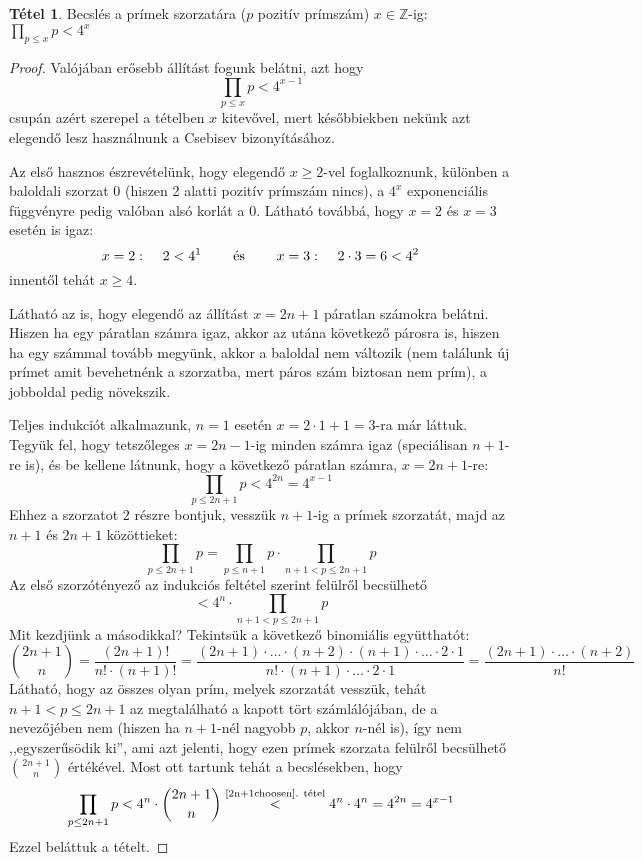 \documentclass[12pt]{book}
\theoremstyle{plain} %
\theoremstyle{definition} %
\newtheorem{theo/}{Tétel}[section]
\newenvironment{theo}
  {\renewcommand{\qedsymbol}{$\clubsuit$}%
   \pushQED{\qed}\begin{theo/}}
  {\popQED\end{theo/}}
\theoremstyle{remark}
\renewcommand\qedsymbol{$\blacksquare$}
\numberwithin{equation}{section}  %
\def\Z{\mathbb{Z}}
\begin{document}
	\begin{theo}\label{primekszorzata}
		Becslés a prímek szorzatára ($p$ pozitív prímszám) $x\in \Z$-ig: $\displaystyle \prod\limits_{p\leq x} p < 4^x$
	\end{theo}

	\begin{proof}
		Valójában erősebb állítást fogunk belátni, azt hogy
		\[ \prod_{p\leq x} p < 4^{x-1}  \]
		csupán azért szerepel a tételben $x$ kitevővel, mert későbbiekben nekünk azt elegendő lesz használnunk a Csebisev bizonyításához.
		
		Az első hasznos észrevételünk, hogy elegendő $x\geq 2$-vel foglalkoznunk, különben a baloldali szorzat $0$ (hiszen 2 alatti pozitív prímszám nincs), a $4^x$ exponenciális függvényre pedig valóban alsó korlát a $0$. Látható továbbá, hogy $x=2$ és $x=3$ esetén is igaz:
		\[ x=2: \hspace{4mm} 2 < 4^1 \hspace{8mm} \text{és} \hspace{8mm} x=3: \hspace{4mm} 2\cdot 3 = 6 < 4^2  \]
		innentől tehát $x\geq 4$.
		
		Látható az is, hogy elegendő az állítást $x=2n+1$ páratlan számokra belátni. Hiszen ha egy páratlan számra igaz, akkor az utána következő párosra is, hiszen ha egy számmal tovább megyünk, akkor a baloldal nem változik (nem találunk új prímet amit bevehetnénk a szorzatba, mert páros szám biztosan nem prím), a jobboldal pedig növekszik.
		
		Teljes indukciót alkalmazunk, $n=1$ esetén $x=2\cdot 1 + 1 = 3$-ra már láttuk. Tegyük fel, hogy tetszőleges $x=2n-1$-ig minden számra igaz (speciálisan $n+1$-re is), és be kellene látnunk, hogy a következő páratlan számra, $x=2n+1$-re:
		\[ \prod_{p\leq 2n+1} p < 4^{2n} = 4^{x-1}  \]
		Ehhez a szorzatot $2$ részre bontjuk, vesszük $n+1$-ig a prímek szorzatát, majd az $n+1$ és $2n+1$ közöttieket:
		\[  \prod_{p\leq 2n+1} p =  \prod_{p\leq n+1} p \cdot  \prod_{n+1 < p\leq 2n+1} p \]
		Az első szorzótényező az indukciós feltétel szerint felülről becsülhető
		\[ < 4^{n} \cdot  \prod_{n+1 < p\leq 2n+1} p  \]
		Mit kezdjünk a másodikkal? Tekintsük a következő binomiális együtthatót:
		\[ {2n+1\choose n} = \dfrac{(2n+1)!}{n!\cdot (n+1)!} = \dfrac{(2n+1)\cdot \ldots \cdot (n+2)\cdot (n+1)\cdot \ldots \cdot 2\cdot 1}{n! \cdot (n+1) \cdot \ldots \cdot 2 \cdot 1} = \dfrac{(2n+1)\cdot \ldots \cdot (n+2)}{n!}  \]
		Látható, hogy az összes olyan prím, melyek szorzatát vesszük, tehát $n+1<p\leq 2n+1$ az megtalálható a kapott tört számlálójában, de a nevezőjében nem (hiszen ha $n+1$-nél nagyobb $p$, akkor $n$-nél is), így nem ,,egyszerűsödik ki'', ami azt jelenti, hogy ezen prímek szorzata felülről becsülhető ${2n+1\choose n}$ értékével. Most ott tartunk tehát a becslésekben, hogy
		\[ \prod_{p\leq 2n+1} p < 4^n \cdot {2n+1\choose n} \stackrel{\text{\ref{2n+1choosen}. tétel}}{<} 4^n \cdot 4^n = 4^{2n} = 4^{x-1} \]
		Ezzel beláttuk a tételt.
	\end{proof}
\end{document}
